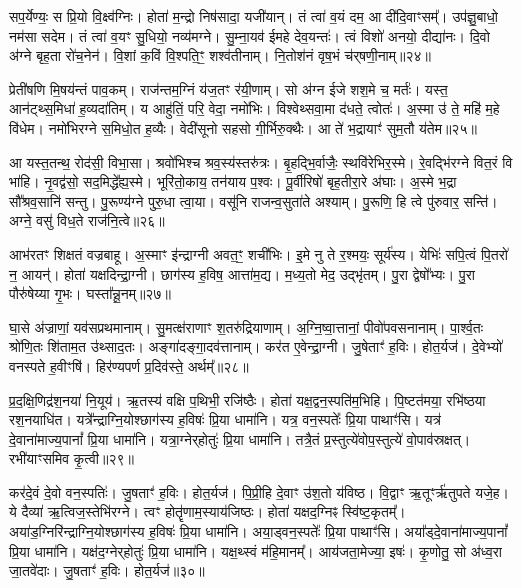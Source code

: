 सप॒र्येण्यः॒ स प्रि॒यो वि॒क्ष्व॑ग्निः।
होता॑ म॒न्द्रो निष॑सादा॒ यजी॑यान्।
तं त्वा॑ व॒यं दम॒ आ दी॑दि॒वाꣳसम्᳚।
उप॑ज्ञु॒बाधो॒ नम॑सा सदेम।
तं त्वा॑ व॒यꣳ सु॒धियो॒ नव्य॑मग्ने।
सु॒म्ना॒यव॑ ईमहे देव॒यन्तः॑।
त्वं विशो॑ अनयो॒ दीद्या॑नः।
दि॒वो अ॑ग्ने बृह॒ता रो॑च॒नेन॑।
वि॒शां क॒विं वि॒श्पति॒ꣳ॒ शश्व॑तीनाम्।
नि॒तोश॑नं वृष॒भं च॑र्‌\mbox{}षणी॒नाम्॥२४॥

प्रेती॑षणि मि॒षय॑न्तं पाव॒कम्।
राज॑न्तम॒ग्निं य॑ज॒तꣳ र॑यी॒णाम्।
सो अ॑ग्न ईजे शश॒मे च॒ मर्तः॑।
यस्त॒ आन॑ट्थ्स॒मिधा॑ ह॒व्यदा॑तिम्।
य आहु॑तिं॒ परि॒ वेदा॒ नमो॑भिः।
विश्वेथ्सवा॒मा द॑धते॒ त्वोतः॑।
अ॒स्मा उ॑ ते॒ महि॑ म॒हे वि॑धेम।
नमो॑भिरग्ने स॒मिधो॒त ह॒व्यैः।
वेदी॑सूनो सहसो गी॒र्भिरु॒क्थैः।
आ ते॑ भ॒द्रायाꣳ॑ सुम॒तौ य॑तेम॥२५॥

आ यस्त॒तन्थ॒ रोद॑सी॒ विभा॒सा।
श्रवो॑भिश्च श्रव॒स्य॑स्तरु॑त्रः।
बृ॒हद्भि॒र्वाजैः॒ स्थवि॑रेभिर॒स्मे।
रे॒वद्भि॑रग्ने वित॒रं वि भा॑हि।
नृ॒वद्व॑सो॒ सद॒मिद्धे᳚ह्य॒स्मे।
भूरि॑तो॒काय॒ तन॑याय प॒श्वः।
पू॒र्वीरिषो॑ बृह॒तीरा॒रे अ॑घाः।
अ॒स्मे भ॒द्रा सौ᳚श्रव॒सानि॑ सन्तु।
पु॒रूण्य॑ग्ने पुरु॒धा त्वा॒या।
वसू॑नि राजन्व॒सुता॑ते अश्याम्।
पु॒रूणि॒ हि त्वे पु॑रुवार॒ सन्ति॑।
अग्ने॒ वसु॑ विध॒ते राज॑नि॒त्वे॥२६॥\anuvakamend[जा॒गृ॒वाꣳसो॒ अनु॑ग्म॒न्मानु॑षाणाञ्चर्‌\mbox{}षणी॒नां य॑तेमाश्या॒न्द्वे च॑]

आभ॑रतꣳ शिक्षतं वज्रबाहू।
अ॒स्माꣳ इ॑न्द्राग्नी अवत॒ꣳ॒ शची॑भिः।
इ॒मे नु ते र॒श्मयः॒ सूर्य॑स्य।
येभिः॑ सपि॒त्वं पि॒तरो॑ न॒ आयन्॑।
होता॑ यक्षदिन्द्रा॒ग्नी।
छाग॑स्य ह॒विष॒ आत्ता॑म॒द्य।
म॒ध्य॒तो मेद॒ उद्भृ॑तम्।
पु॒रा द्वेषो᳚भ्यः।
पु॒रा पौरु॑षेय्या गृ॒भः।
घस्ता᳚न्नू॒नम्॥२७॥

घा॒से अ॑ज्राणां॒ यव॑सप्रथमानाम्।
सु॒मत्क्ष॑राणाꣳ श॒तरु॑द्रि\-याणाम्।
अ॒ग्नि॒ष्वा॒त्तानां॒ पीवो॑पवसनानाम्।
पा॒र्श्व॒तः श्रो॑णि॒तः शि॑ताम॒त उ॑थ्साद॒तः।
अङ्गा॑दङ्गा॒दव॑त्तानाम्।
कर॑त ए॒वेन्द्रा॒ग्नी।
जु॒षेताꣳ॑ ह॒विः।
होत॒र्यज॑।
दे॒वेभ्यो॑ वनस्पते ह॒वीꣳषि॑।
हिर॑ण्यपर्ण प्र॒दिव॑स्ते॒ अर्थम्᳚॥२८॥

प्र॒द॒क्षि॒णिद्र॑श॒नया॑ नि॒यूय॑।
ऋ॒तस्य॑ वक्षि प॒थिभी॒ रजि॑ष्ठैः।
होता॑ यक्ष॒द्वन॒स्पति॑म॒भिहि।
पि॒ष्टत॑मया॒ रभि॑ष्ठया रश॒नयाधि॑त।
यत्रे᳚न्द्राग्नि॒योश्छाग॑स्य ह॒विषः॑ प्रि॒या धामा॑नि।
यत्र॒ वन॒स्पतेः᳚ प्रि॒या पाथाꣳ॑सि।
यत्र॑ दे॒वाना॑माज्य॒पानां᳚ प्रि॒या धामा॑नि।
यत्रा॒ग्नेर्‌\mbox{}होतुः॑ प्रि॒या धामा॑नि।
तत्रै॒तं प्र॒स्तुत्ये॑वोप॒स्तुत्ये॑ वो॒पाव॑स्रक्षत्।
रभी॑याꣳसमिव कृ॒त्वी॥२९॥

कर॑दे॒वं दे॒वो वन॒स्पतिः॑।
जु॒षताꣳ॑ ह॒विः।
होत॒र्यज॑।
पि॒प्री॒हि दे॒वाꣳ उ॑श॒तो य॑विष्ठ।
वि॒द्वाꣳ ऋ॒तूꣳर्\mbox{}ऋ॑तुपते यजे॒ह।
ये दैव्या॑ ऋ॒त्विज॒स्तेभि॑रग्ने।
त्वꣳ होतॄ॑णाम॒स्याय॑जिष्ठः।
होता॑ यक्षद॒ग्निꣴ स्वि॑ष्ट॒कृतम्᳚।
अया॑ड॒ग्निरि॑न्द्राग्नि॒योश्छाग॑स्य ह॒विषः॑ प्रि॒या धामा॑नि।
अया॒ड्वन॒स्पतेः᳚ प्रि॒या पाथाꣳ॑सि।
अया᳚ड्दे॒वाना॑माज्य॒पानां᳚ प्रि॒या धामा॑नि।
यक्ष॑द॒ग्नेर्‌\mbox{}होतुः॑ प्रि॒या धामा॑नि।
यक्ष॒थ्स्वं म॑हि॒मानम्᳚।
आय॑जता॒मेज्या॒ इषः॑।
कृ॒णोतु॒ सो अ॑ध्व॒रा जा॒तवे॑दाः।
जु॒षताꣳ॑ ह॒विः।
होत॒र्यज॑॥३०॥\anuvakamend[नू॒नमर्थं॑ कृ॒त्वी पाथाꣳ॑सि स॒प्त च॑]

